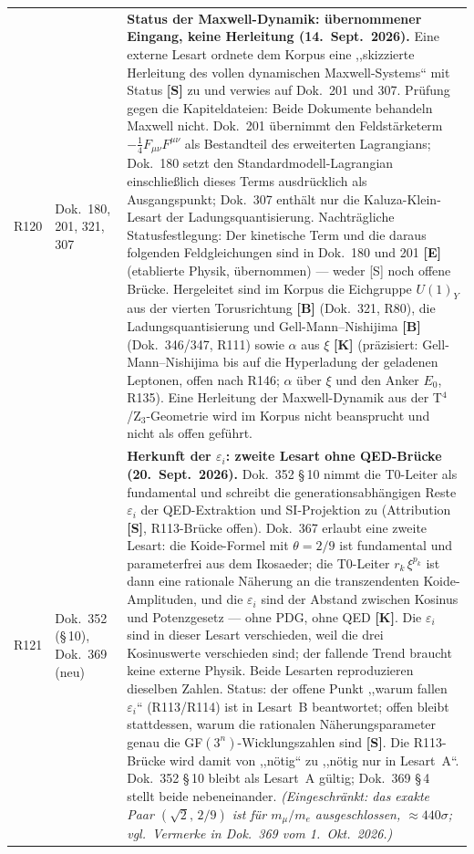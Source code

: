 \begin{longtable}{@{}p{0.9cm}p{3.1cm}p{10.2cm}@{}}
R120 & Dok.~180, 201, 321, 307 & \textbf{Status der Maxwell-Dynamik: übernommener Eingang, keine Herleitung (14.~Sept.~2026).} Eine externe Lesart ordnete dem Korpus eine ,,skizzierte Herleitung des vollen dynamischen Maxwell-Systems`` mit Status \textbf{[S]} zu und verwies auf Dok.~201 und 307. Prüfung gegen die Kapiteldateien: Beide Dokumente behandeln Maxwell nicht. Dok.~201 übernimmt den Feldstärketerm $-\tfrac14 F_{\mu\nu}F^{\mu\nu}$ als Bestandteil des erweiterten Lagrangians; Dok.~180 setzt den Standardmodell-Lagrangian einschließlich dieses Terms ausdrücklich als Ausgangspunkt; Dok.~307 enthält nur die Kaluza-Klein-Lesart der Ladungsquantisierung. Nachträgliche Statusfestlegung: Der kinetische Term und die daraus folgenden Feldgleichungen sind in Dok.~180 und 201 \textbf{[E]} (etablierte Physik, übernommen) --- weder [S] noch offene Brücke. Hergeleitet sind im Korpus die Eichgruppe $U(1)_Y$ aus der vierten Torusrichtung \textbf{[B]} (Dok.~321, R80), die Ladungsquantisierung und Gell-Mann--Nishijima \textbf{[B]} (Dok.~346/347, R111) sowie $\alpha$ aus $\xi$ \textbf{[K]} (präzisiert: Gell-Mann--Nishijima bis auf die Hyperladung der geladenen Leptonen, offen nach R146; $\alpha$ über $\xi$ und den Anker $E_0$, R135). Eine Herleitung der Maxwell-Dynamik aus der T$^4$/Z$_3$-Geometrie wird im Korpus nicht beansprucht und nicht als offen geführt. \\
R121 & Dok.~352 (§\,10), Dok.~369 (neu) & \textbf{Herkunft der $\varepsilon_i$: zweite Lesart ohne QED-Brücke (20.~Sept.~2026).} Dok.~352 §\,10 nimmt die T0-Leiter als fundamental und schreibt die generationsabhängigen Reste $\varepsilon_i$ der QED-Extraktion und SI-Projektion zu (Attribution \textbf{[S]}, R113-Brücke offen). Dok.~367 erlaubt eine zweite Lesart: die Koide-Formel mit $\theta=2/9$ ist fundamental und parameterfrei aus dem Ikosaeder; die T0-Leiter $r_k\,\xi^{p_k}$ ist dann eine rationale Näherung an die transzendenten Koide-Amplituden, und die $\varepsilon_i$ sind der Abstand zwischen Kosinus und Potenzgesetz --- ohne PDG, ohne QED \textbf{[K]}. Die $\varepsilon_i$ sind in dieser Lesart verschieden, weil die drei Kosinuswerte verschieden sind; der fallende Trend braucht keine externe Physik. Beide Lesarten reproduzieren dieselben Zahlen. Status: der offene Punkt ,,warum fallen $\varepsilon_i$`` (R113/R114) ist in Lesart~B beantwortet; offen bleibt stattdessen, warum die rationalen Näherungsparameter genau die GF$(3^n)$-Wicklungszahlen sind \textbf{[S]}. Die R113-Brücke wird damit von ,,nötig`` zu ,,nötig nur in Lesart~A``. Dok.~352 §\,10 bleibt als Lesart~A gültig; Dok.~369 §\,4 stellt beide nebeneinander. \emph{(Eingeschränkt: das exakte Paar $(\sqrt2,\,2/9)$ ist für $m_\mu/m_e$ ausgeschlossen, ${\approx}440\sigma$; vgl.\ Vermerke in Dok.~369 vom 1.~Okt.~2026.)} \\

\end{longtable}
